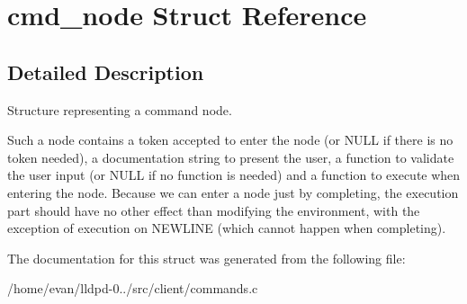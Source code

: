 \section{cmd\-\_\-node \-Struct \-Reference}
\label{structcmd__node}


\subsection{\-Detailed \-Description}
\-Structure representing a command node.

\-Such a node contains a token accepted to enter the node (or {\ttfamily \-N\-U\-L\-L} if there is no token needed), a documentation string to present the user, a function to validate the user input (or {\ttfamily \-N\-U\-L\-L} if no function is needed) and a function to execute when entering the node. \-Because we can enter a node just by completing, the execution part should have no other effect than modifying the environment, with the exception of execution on {\ttfamily \-N\-E\-W\-L\-I\-N\-E} (which cannot happen when completing). 

\-The documentation for this struct was generated from the following file\-:\begin{DoxyCompactItemize}
\item 
/home/evan/lldpd-\/0../src/client/commands.\-c\end{DoxyCompactItemize}
